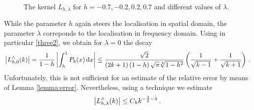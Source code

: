 \documentclass[11pt,a4paper,twoside,bibtotoc]{scrartcl}
\theoremstyle{plain}
\theoremstyle{definition}
\theoremstyle{remark}
\numberwithin{equation}{section}
\numberwithin{table}{section}
\numberwithin{figure}{section}
\begin{document}
  \begin{figure}[tb]
    \centering
    \hfill
    \\
    \hfill
    \caption{The kernel $L_{h,\lambda}$ for $h = -0.7, -0.2, 0.2, 0.7$ and different values of $\lambda$.}
    \label{Basics:Figure:LKernel}
  \end{figure}
  While the parameter $h$ again steers the localisation in spatial domain, the
  parameter $\lambda$ correponds to the localisation in frequency domain.
  Using in particular \eqref{three2}, we obtain for $\lambda=0$ the decay
  \[
  \left|L_{h,0}^{\wedge}{\hspace{-0.4ex}}\left(k\right)\right| = \frac{1}{1-h}
  \left|\int_{h}^{1} P_{k}{\hspace{-0.4ex}}\left(x\right) \text{\rm{d}} x\right| \le
  \frac{\sqrt{2}}{\left(2k+1\right)\left(1-h\right)\sqrt{\pi}\sqrt[4]{1-h^2}}
  \left(\frac{1}{\sqrt{k-1}}+\frac{1}{\sqrt{k+1}}\right)\,.
  \]
  Unfortunately, this is not sufficient for an estimate of the relative error
  by means of Lemma \ref{lemma:error}.
  Nevertheless, using a technique we estimate
  \[
  \left|L_{h,\lambda}^{\wedge}{\hspace{-0.4ex}}\left(k\right)\right| \le C_h
  k^{-\frac{3}{2}-\lambda}\,.
  \] 
\end{document}
